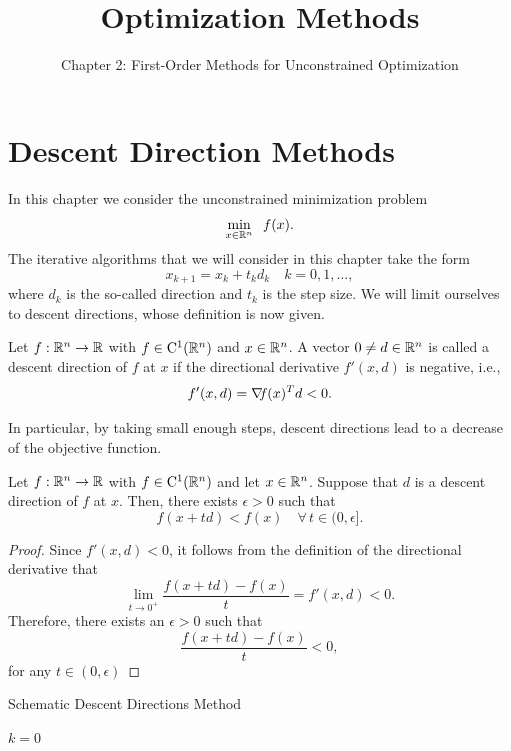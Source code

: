 \documentclass[10pt,a4paper]{article}
\title{Optimization Methods}
\author{Chapter 2: First-Order Methods for Unconstrained Optimization}
\date{}
\begin{document}
	\maketitle
	\section{Descent Direction Methods}
	\noindent In this chapter we consider the unconstrained minimization problem
	\begin{equation*}
		\min_{x\in\mathbb{R}^n} \;\; f(x).
	\end{equation*}
The iterative algorithms that we will consider in this chapter take the form
\begin{equation*}
	x_{k+1} = x_k +t_k d_k \quad k=0,1, \dots,
\end{equation*}
where $d_k$ is the so-called direction and $t_k$ is the step size. We will limit ourselves to descent
directions, whose definition is now given.
\begin{definition}
	Let $f:\mathbb{R}^n\to\mathbb{R}$ with $f\in\mathord{\mathrm{C^1}}(\mathbb{R}^n)$ and $x\in \mathbb{R}^n$. A vector $0\neq d\in \mathbb{R}^n$ is called a descent direction of $f$ at $x$ if the directional derivative $f'(x,d)$ is negative, i.e., 
	\begin{equation*}
		f'(x,d)= \operatorname*{\mathit{\nabla \!f}}(x)^T d < 0.
	\end{equation*}
\end{definition}
\noindent In particular, by taking small enough steps, descent directions lead to a decrease of the objective function.
\begin{lemma}
	Let $f:\mathbb{R}^n\to\mathbb{R}$ with $f\in\mathord{\mathrm{C^1}}(\mathbb{R}^n)$ and let $x\in \mathbb{R}^n$. Suppose that $d$ is a descent direction of $f$ at $x$. Then, there exists $\epsilon>0$ such that 
	\begin{equation*}
		f(x+td) < f(x) \quad \forall \, t \in (0,\epsilon].
	\end{equation*} 
\end{lemma}
\begin{proof}
	Since $f'(x,d)<0$, it follows from the definition of the directional derivative that 
	\begin{equation*}
		\lim_{t\to 0^+}\frac{f(x+td)-f(x)}{t} = f'(x,d) <0.
	\end{equation*}
Therefore, there exists an $\epsilon>0$ such that 
\begin{equation*}
	\frac{f(x+td)-f(x)}{t}<0,
\end{equation*}
for any $t\in(0,\epsilon)$
\end{proof}
\begin{algorithm}[H]\label{alg}
	\caption{Schematic Descent Directions Method}
	
	
	$k = 0$
	
\end{algorithm}
\end{document}
